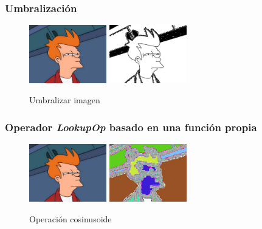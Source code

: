\subsubsection{Umbralización}
\vskip0.3cm
\begin{figure}[H]
 \centering
  \includegraphics[width=0.3\textwidth]{imagenes/Fry.jpg}
  \includegraphics[width=0.3\textwidth]{imagenes/fryUmbralizado.jpg}
 \caption{Umbralizar imagen}
 \label{diseño}
\end{figure}
\subsubsection{Operador \textit{LookupOp} basado en una función propia}
\vskip0.3cm
\begin{figure}[H]
 \centering
  \includegraphics[width=0.3\textwidth]{imagenes/Fry.jpg}
  \includegraphics[width=0.3\textwidth]{imagenes/fryCos.jpg}
 \caption{Operación cosinusoide}
 \label{diseño}
 \end{figure}
